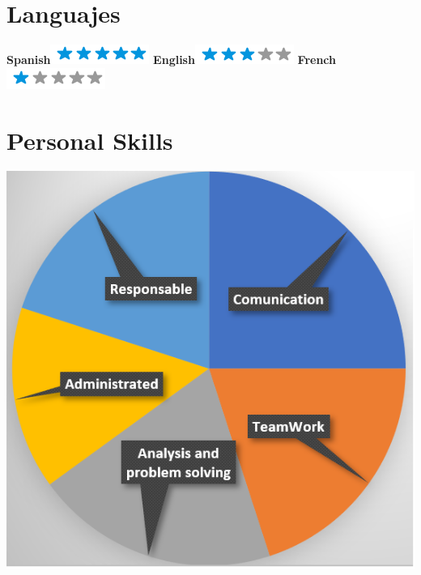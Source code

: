 \documentclass[]{friggeri-cv}
\begin{document}
\begin{aside}
  \section{Languajes}
    \textbf{Spanish}\includegraphics[scale=0.40]{img/5stars.png}
    \textbf{English}\includegraphics[scale=0.40]{img/3stars.png}
    \textbf{French}\includegraphics[scale=0.40]{img/1stars.png}
  ~
  \section{Personal Skills}
    \includegraphics[scale=0.28]{H2.png}
    ~
\end{aside}
\end{document}
